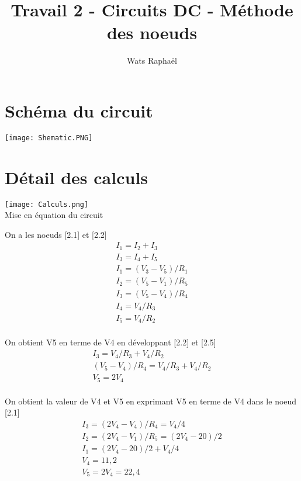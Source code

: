 \documentclass{homeworg}
\title{Travail 2 - Circuits DC - Méthode des noeuds}
\author{Wats Raphaël}
\begin{document}
\maketitle

\section{Schéma du circuit}
    \begin{center}
        \texttt{[image: Shematic.PNG]}
    \end{center}

\section{Détail des calculs}
    \begin{center}
        \texttt{[image: Calculs.png]}\\
        \large Mise en équation du circuit
    \end{center}
    
    On a les noeuds [2.1] et [2.2]
    \begin{align}
        I_1 = I_2 + I_3\\
        I_3 = I_4 + I_5\\
        I_1 = (V_3 - V_5) / R_1\\
        I_2 = (V_5 - V_1) / R_5\\
        I_3 = (V_5 - V_4) / R_4\\
        I_4 = V_4 / R_3\\
        I_5 = V_4 / R_2\\
    \end{align}
    
    On obtient V5 en terme de V4 en développant [2.2] et [2.5]
    \begin{align}
        I_3 = V_4 / R_3 + V_4 / R_2\\
        (V_5 - V_4) / R_4 = V_4 / R_3 + V_4 / R_2\\
        V_5 = 2V_4\\
    \end{align}
    
    On obtient la valeur de V4 et V5 en exprimant V5 en terme de V4 dans le noeud [2.1]
    \begin{align}
        I_3 = (2V_4 - V_4) / R_4 = V_4 / 4\\
        I_2 = (2V_4 - V_1) / R_5 = (2V_4 - 20) / 2\\
        I_1 = (2V_4 - 20) / 2 + V_4 / 4\\
        V_4 = 11,2\\
        V_5 = 2V_4 = 22,4\\
    \end{align}
    
\end{document}
